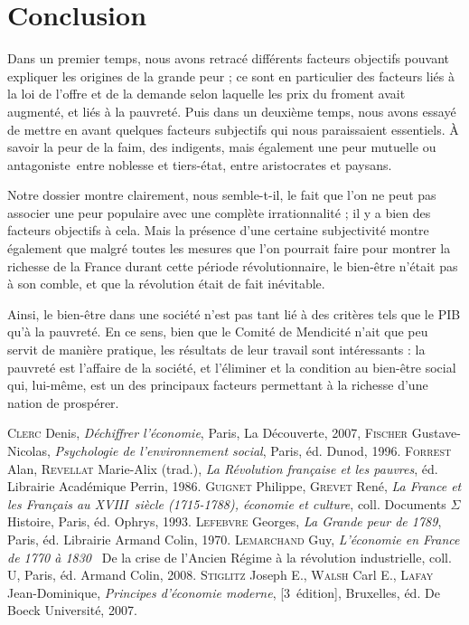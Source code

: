 \documentclass[a4paper,11pt,]{scrartcl}
\begin{document}
\section{Conclusion}
  
  Dans un premier temps, nous avons retracé différents facteurs objectifs pouvant expliquer les origines de la grande peur ; ce sont en particulier des facteurs liés à la loi de l'offre et de la demande selon laquelle les prix du froment avait augmenté, et liés à la pauvreté. Puis dans un deuxième temps, nous avons essayé de mettre en avant quelques facteurs subjectifs qui nous paraissaient essentiels. À savoir la peur de la faim, des indigents, mais également une peur mutuelle ou \og antagoniste\fg~entre noblesse et tiers-état, entre aristocrates et paysans.
  
  Notre dossier montre clairement, nous semble-t-il, le fait que l'on ne peut pas associer une peur populaire avec une complète irrationnalité ; il y a bien des facteurs objectifs à cela. Mais la présence d'une certaine subjectivité montre également que malgré toutes les mesures que l'on pourrait faire pour montrer la richesse de la France durant cette période révolutionnaire, le bien-être n'était pas à son comble, et que la révolution était de fait inévitable.
  
  Ainsi, le bien-être dans une société n'est pas tant lié à des critères tels que le PIB qu'à la pauvreté. En ce sens, bien que le Comité de Mendicité n'ait que peu servit de manière pratique, les résultats de leur travail sont intéressants : la pauvreté est l'affaire de la société, et l'éliminer et la condition au bien-être social qui, lui-même, est un des principaux facteurs permettant à la richesse d'une nation de prospérer.
  
 \newpage
\begin{thebibliography}{7}
\textsc{Clerc} Denis, \emph{D\'echiffrer l'\'economie}, Paris, La D\'ecouverte, 2007,
\textsc{Fischer} Gustave-Nicolas, \emph{Psychologie de l'environnement social}, Paris, éd. Dunod, 1996.
\textsc{Forrest} Alan, \textsc{Revellat} Marie-Alix (trad.), \emph{La Révolution française et les pauvres}, éd. Librairie Académique Perrin, 1986.
\textsc{Guignet} Philippe, \textsc{Grevet} René, \emph{La France et les Français au XVIII\ieme~siècle (1715-1788), économie et culture}, coll. \og Documents $\Sigma$ Histoire\fg, Paris, éd. Ophrys, 1993.
\textsc{Lefebvre} Georges, \emph{La Grande peur de 1789}, Paris, éd. Librairie Armand Colin, 1970.
\textsc{Lemarchand} Guy, \emph{L'économie en France de 1770 à 1830} \textemdash~De la crise de l'Ancien Régime à la révolution industrielle, coll. U, Paris, éd. Armand Colin, 2008.
\textsc{Stiglitz} Joseph E., \textsc{Walsh} Carl E., \textsc{Lafay} Jean-Dominique, \emph{Principes d'économie moderne}, [3\ieme~édition], Bruxelles, éd. De Boeck Université, 2007.
\end{thebibliography}
\end{document}
